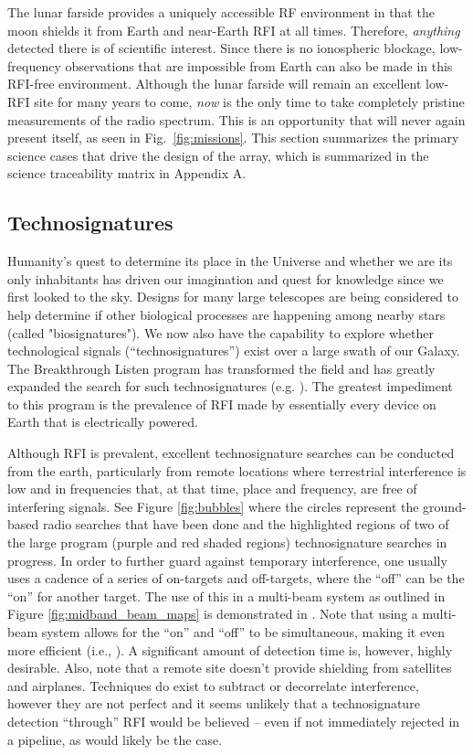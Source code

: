 The lunar farside provides a uniquely accessible RF environment in that the moon shields it from Earth and near-Earth RFI at all times. Therefore, {\em anything} detected there is of scientific interest. Since there is no ionospheric blockage, low-frequency observations that are impossible from Earth can also be made in this RFI-free environment. Although the lunar farside will remain an excellent low-RFI site for many years to come, {\em now} is the only time to take completely pristine measurements of the radio spectrum. This is an opportunity that will never again present itself, as seen in Fig.\ \ref{fig:missions}.  This section summarizes the primary science cases that drive the design of the array, which is summarized in the science traceability matrix in Appendix A.

\subsection{Technosignatures}
Humanity's quest to determine its place in the Universe and whether we are its only inhabitants has driven our imagination and quest for knowledge since we first looked to the sky.  Designs for many large telescopes are being considered to help determine if other biological processes are happening among nearby stars (called "biosignatures").  We now also have the capability to explore whether technological signals (``technosignatures'') exist over a large swath of our Galaxy.  The Breakthrough Listen program has transformed the field and has greatly expanded the search for such technosignatures (e.g. \citealt{Enriquez_2017, Price_2020, Gajjar_2021}).  The greatest impediment to this program is the prevalence of RFI made by essentially every device on Earth that is electrically powered.

Although RFI is prevalent, excellent technosignature searches can be conducted from the earth, particularly from remote locations where terrestrial interference is low and in frequencies that, at that time, place and frequency, are free of interfering signals. See Figure \ref{fig:bubbles} where the circles represent the ground-based radio searches that have been done and the highlighted regions of two of the large program (purple and red shaded regions) technosignature searches in progress. In order to further guard against temporary interference, one usually uses a cadence of a series of on-targets and off-targets, where the ``off'' can be the ``on'' for another target. The use of this in a multi-beam system as outlined in Figure \ref{fig:midband_beam_maps} is demonstrated in \cite{Huang_2023}. Note that using a multi-beam system allows for the ``on'' and ``off'' to be simultaneous, making it even more efficient (i.e., \citealt{multibeam}). A significant amount of detection time is, however, highly desirable. Also, note that a remote site doesn't provide shielding from satellites and airplanes. Techniques do exist to subtract or decorrelate interference, however they are not perfect and it seems unlikely that a technosignature detection ``through'' RFI would be believed -- even if not immediately rejected in a pipeline, as would likely be the case.

